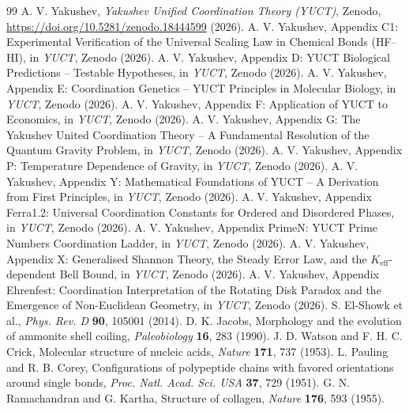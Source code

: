 \documentclass[12pt]{article}
\begin{document}
	\begin{thebibliography}{99}
		A. V. Yakushev, \emph{Yakushev Unified Coordination Theory (YUCT)}, Zenodo, \url{https://doi.org/10.5281/zenodo.18444599} (2026).
		A. V. Yakushev, Appendix C1: Experimental Verification of the Universal Scaling Law in Chemical Bonds (HF--HI), in \emph{YUCT}, Zenodo (2026).
		A. V. Yakushev, Appendix D: YUCT Biological Predictions -- Testable Hypotheses, in \emph{YUCT}, Zenodo (2026).
		A. V. Yakushev, Appendix E: Coordination Genetics -- YUCT Principles in Molecular Biology, in \emph{YUCT}, Zenodo (2026).
		A. V. Yakushev, Appendix F: Application of YUCT to Economics, in \emph{YUCT}, Zenodo (2026).
		A. V. Yakushev, Appendix G: The Yakushev United Coordination Theory -- A Fundamental Resolution of the Quantum Gravity Problem, in \emph{YUCT}, Zenodo (2026).
		A. V. Yakushev, Appendix P: Temperature Dependence of Gravity, in \emph{YUCT}, Zenodo (2026).
		A. V. Yakushev, Appendix Y: Mathematical Foundations of YUCT -- A Derivation from First Principles, in \emph{YUCT}, Zenodo (2026).
		A. V. Yakushev, Appendix Ferra1.2: Universal Coordination Constants for Ordered and Disordered Phases, in \emph{YUCT}, Zenodo (2026).
		A. V. Yakushev, Appendix PrimeN: YUCT Prime Numbers Coordination Ladder, in \emph{YUCT}, Zenodo (2026).
		A. V. Yakushev, Appendix X: Generalised Shannon Theory, the Steady Error Law, and the \(K_{\mathrm{eff}}\)-dependent Bell Bound, in \emph{YUCT}, Zenodo (2026).
		A. V. Yakushev, Appendix Ehrenfest: Coordination Interpretation of the Rotating Disk Paradox and the Emergence of Non-Euclidean Geometry, in \emph{YUCT}, Zenodo (2026).
		S. El-Showk et al., \emph{Phys. Rev. D} \textbf{90}, 105001 (2014).
		D. K. Jacobs, Morphology and the evolution of ammonite shell coiling, \emph{Paleobiology} \textbf{16}, 283 (1990).
		J. D. Watson and F. H. C. Crick, Molecular structure of nucleic acids, \emph{Nature} \textbf{171}, 737 (1953).
		L. Pauling and R. B. Corey, Configurations of polypeptide chains with favored orientations around single bonds, \emph{Proc. Natl. Acad. Sci. USA} \textbf{37}, 729 (1951).
		G. N. Ramachandran and G. Kartha, Structure of collagen, \emph{Nature} \textbf{176}, 593 (1955).

\end{thebibliography}
\end{document}
